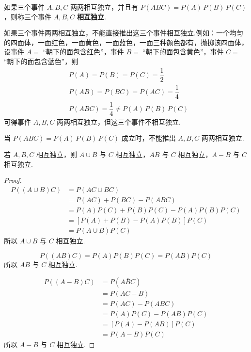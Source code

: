 \begin{definition}
    \indent 如果三个事件 $A,B,C$ 两两相互独立，并且有 $P(ABC)=P(A)\,P(B)\,P(C)$，则称三个事件 $A,B,C$ \textbf{相互独立}.
\end{definition}

\begin{note}
    \indent 如果三个事件两两相互独立，不能直接推出这三个事件相互独立.例如：一个均匀的四面体，一面红色，一面黄色，一面蓝色，一面三种颜色都有，抛掷该四面体，设事件 $A=$ “朝下的面包含红色”，事件 $B=$ “朝下的面包含黄色”，事件 $C=$ “朝下的面包含蓝色”，则
    $$
    \begin{aligned}
        & P(A) = P(B) = P(C) = \dfrac{1}{2} \\
        & P(AB) = P(BC) = P(AC) = \dfrac{1}{4} \\
        & P(ABC) = \dfrac{1}{4} \not= P(A) \, P(B) \, P(C)
    \end{aligned}
    $$
    可得事件 $A,B,C$ 两两相互独立，但这三个事件不相互独立.

    当 $P(ABC)=P(A)\,P(B)\,P(C)$ 成立时，不能推出 $A,B,C$ 两两相互独立.
\end{note}

\begin{conclusion}
    \indent 若 $A,B,C$ 相互独立，则 $A \cup B$ 与 $C$ 相互独立，$AB$ 与 $C$ 相互独立，$A-B$ 与 $C$ 相互独立.
\end{conclusion}

\begin{proof}
    $$
    \begin{aligned}
        P((A \cup B) C) &= P(AC \cup BC) \\
        &= P(AC) + P(BC) - P(ABC) \\
        &= P(A) P(C) + P(B) P(C) - P(A) P(B) P(C) \\
        &= [P(A) + P(B) - P(A) P(B)] P(C) \\
        &= P(A \cup B) P(C)
    \end{aligned}
    $$
    所以 $A \cup B$ 与 $C$ 相互独立.

    $$
    P((AB)C) = P(A) P(B) P(C) = P(AB) P(C)
    $$
    所以 $AB$ 与 $C$ 相互独立.

    $$
    \begin{aligned}
        P((A-B)C) &= P(A \overline{B} C) \\
        &= P(AC-B) \\
        &= P(AC) - P(ABC) \\
        &= P(A) P(C) - P(AB) P(C) \\
        &= [P(A) - P(AB)] P(C) \\
        &= P(A-B) P(C)
    \end{aligned}
    $$
    所以 $A-B$ 与 $C$ 相互独立.
\end{proof}

